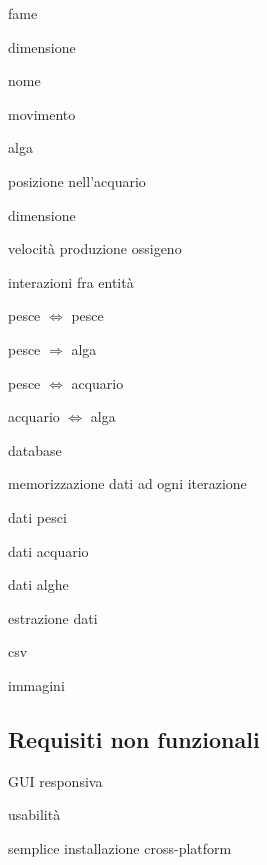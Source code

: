 \documentclass[12pt,a4paper,oneside,article]{article}
\begin{document}
\begin{legal}[label*=3.\arabic*.]
\begin{legal}
\begin{legal}
\begin{legal}
    				\item fame
    				\item dimensione
    				\item nome
    			\end{legal}
    			\item movimento
    		\end{legal}
    		\item alga
    		\begin{legal}
    			\item posizione nell'acquario
    			\item dimensione
    			\item velocità produzione ossigeno
    		\end{legal}
    		\item interazioni fra entità
    		\begin{legal}
    			\item pesce $\iff$ pesce
    			\item pesce $\Rightarrow$ alga
    			\item pesce $\iff$ acquario
    			\item acquario $\iff$ alga
    		\end{legal}
    	\end{legal}
    	\item database
    	\begin{legal}
    		\item memorizzazione dati ad ogni iterazione
    		\begin{legal}
    			\item dati pesci
    			\item dati acquario
    			\item dati alghe
    		\end{legal}
    		\item estrazione dati
    		\begin{legal}
    			\item csv
    			\item immagini
    		\end{legal}
    	\end{legal}
    \end{legal}

	\subsection{Requisiti non funzionali}
	\begin{legal}[label*=4.\arabic*.]
		\item GUI responsiva
		\item usabilità
		\item semplice installazione cross-platform
	\end{legal}
    
\end{document}
